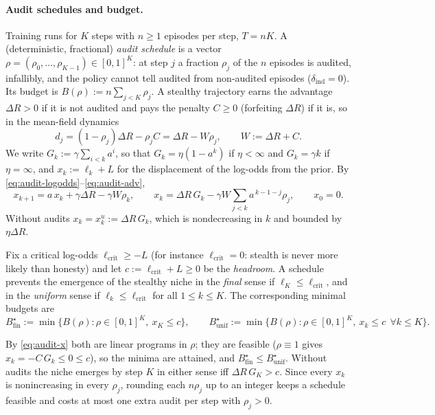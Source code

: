 \paragraph{Audit schedules and budget.} Training runs for $K$ steps with $n\ge1$
episodes per step, $T=nK$. A (deterministic, fractional) \emph{audit schedule}
is a vector $\rho=(\rho_0,\dots,\rho_{K-1})\in[0,1]^K$: at step $j$ a fraction
$\rho_j$ of the $n$ episodes is audited, infallibly, and the policy cannot tell
audited from non-audited episodes ($\delta_{\mathrm{ind}}=0$). Its budget is
$B(\rho):=n\sum_{j<K}\rho_j$. A stealthy trajectory earns the advantage
$\Delta R>0$ if it is not audited and pays the penalty $C\ge0$ (forfeiting
$\Delta R$) if it is, so in the mean-field dynamics
\begin{equation}\label{eq:audit-adv}
  d_j=(1-\rho_j)\Delta R-\rho_j C=\Delta R-W\rho_j,\qquad W:=\Delta R+C .
\end{equation}
We write $G_k:=\gamma\sum_{i<k}a^i$, so that $G_k=\eta(1-a^k)$ if $\eta<\infty$
and $G_k=\gamma k$ if $\eta=\infty$, and $x_k:=\ell_k+L$ for the displacement of
the log-odds from the prior. By \eqref{eq:audit-logodds}--\eqref{eq:audit-adv},
\begin{equation}\label{eq:audit-x}
  x_{k+1}=a\,x_k+\gamma\Delta R-\gamma W\rho_k,\qquad
  x_k=\Delta R\,G_k-\gamma W\sum_{j<k}a^{\,k-1-j}\rho_j,\qquad x_0=0 .
\end{equation}
Without audits $x_k=x^{u}_k:=\Delta R\,G_k$, which is nondecreasing in $k$ and
bounded by $\eta\Delta R$.

\begin{definition}\label{def:audit-budgets}
Fix a critical log-odds $\ell_{\mathrm{crit}}\ge -L$ (for instance
$\ell_{\mathrm{crit}}=0$: stealth is never more likely than honesty) and let
$c:=\ell_{\mathrm{crit}}+L\ge0$ be the \emph{headroom}. A schedule prevents the
emergence of the stealthy niche in the \emph{final} sense if
$\ell_K\le\ell_{\mathrm{crit}}$, and in the \emph{uniform} sense if
$\ell_k\le\ell_{\mathrm{crit}}$ for all $1\le k\le K$. The corresponding minimal
budgets are
\[
  B^\star_{\mathrm{fin}}:=\min\{B(\rho):\rho\in[0,1]^K,\ x_K\le c\},\qquad
  B^\star_{\mathrm{unif}}:=\min\{B(\rho):\rho\in[0,1]^K,\ x_k\le c\ \ \forall k\le K\}.
\]
\end{definition}
By \eqref{eq:audit-x} both are linear programs in $\rho$; they are feasible
($\rho\equiv1$ gives $x_k=-C\,G_k\le0\le c$), so the minima are attained, and
$B^\star_{\mathrm{fin}}\le B^\star_{\mathrm{unif}}$. Without audits the niche
emerges by step $K$ in either sense iff $\Delta R\,G_K>c$. Since every $x_k$ is
nonincreasing in every $\rho_j$, rounding each $n\rho_j$ up to an integer keeps
a schedule feasible and costs at most one extra audit per step with $\rho_j>0$.

